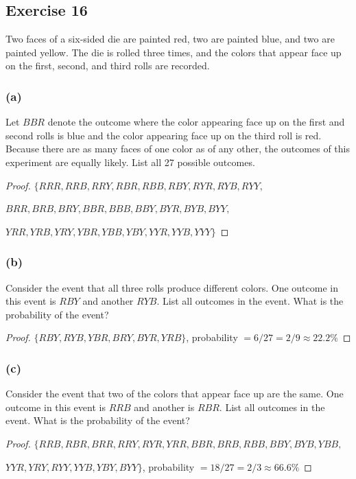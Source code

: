 \documentclass[14pt]{extarticle}
\begin{document}
\subsection{Exercise 16}
Two faces of a six-sided die are painted red, two are painted blue, and two are painted yellow. The die is rolled 
three times, and the colors that appear face up on the first, second, and third rolls are recorded.


\subsubsection{(a)}
Let \(BBR\) denote the outcome where the color appearing face up on the first and second rolls is blue and the color 
appearing face up on the third roll is red. Because there are as many faces of one color as of any other, the 
outcomes of this experiment are equally likely. List all 27 possible outcomes.

\begin{proof}
\(\{RRR, RRB, RRY, RBR, RBB, RBY, RYR, RYB, RYY,\) 

\(BRR, BRB, BRY, BBR, BBB, BBY, BYR, BYB, BYY,\)

\(YRR, YRB, YRY, YBR, YBB, YBY, YYR, YYB, YYY\}\)
\end{proof}

\subsubsection{(b)}
Consider the event that all three rolls produce different colors. One outcome in this event is \(RBY\) and another 
\(RYB\). List all outcomes in the event. What is the probability of the event?

\begin{proof}
\(\{RBY, RYB, YBR, BRY, BYR, YRB\}\), probability \(= 6/27 = 2/9 \approx 22.2\%\)
\end{proof}

\subsubsection{(c)}
Consider the event that two of the colors that appear face up are the same. One outcome in this event is \(RRB\) and 
another is \(RBR\). List all outcomes in the event. What is the probability of the event?

\begin{proof}
\(\{RRB, RBR, BRR, RRY, RYR, YRR, BBR, BRB, RBB, BBY, BYB, YBB,\)

\(YYR, YRY, RYY, YYB, YBY, BYY\}\), probability \(= 18/27 = 2/3 \approx 66.6\%\)
\end{proof}
\end{document}
